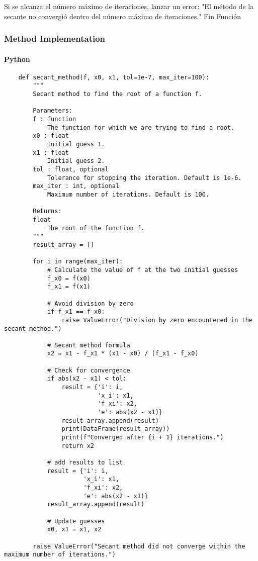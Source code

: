 \documentclass{article}
\begin{document}
  Si se alcanza el número máximo de iteraciones, lanzar un error: "El método de la secante no convergió dentro del número máximo de iteraciones."
Fin Función

        \subsubsection{Method Implementation}
            \paragraph{Python}
                \begin{verbatim}
    def secant_method(f, x0, x1, tol=1e-7, max_iter=100):
        """
        Secant method to find the root of a function f.

        Parameters:
        f : function
            The function for which we are trying to find a root.
        x0 : float
            Initial guess 1.
        x1 : float
            Initial guess 2.
        tol : float, optional
            Tolerance for stopping the iteration. Default is 1e-6.
        max_iter : int, optional
            Maximum number of iterations. Default is 100.

        Returns:
        float
            The root of the function f.
        """
        result_array = []

        for i in range(max_iter):
            # Calculate the value of f at the two initial guesses
            f_x0 = f(x0)
            f_x1 = f(x1)

            # Avoid division by zero
            if f_x1 == f_x0:
                raise ValueError("Division by zero encountered in the secant method.")

            # Secant method formula
            x2 = x1 - f_x1 * (x1 - x0) / (f_x1 - f_x0)

            # Check for convergence
            if abs(x2 - x1) < tol:
                result = {'i': i,
                          'x_i': x1,
                          'f_xi': x2,
                          'e': abs(x2 - x1)}
                result_array.append(result)
                print(DataFrame(result_array))
                print(f"Converged after {i + 1} iterations.")
                return x2

            # add results to list
            result = {'i': i,
                      'x_i': x1,
                      'f_xi': x2,
                      'e': abs(x2 - x1)}
            result_array.append(result)

            # Update guesses
            x0, x1 = x1, x2

        raise ValueError("Secant method did not converge within the maximum number of iterations.")
                \end{verbatim}
\end{document}
